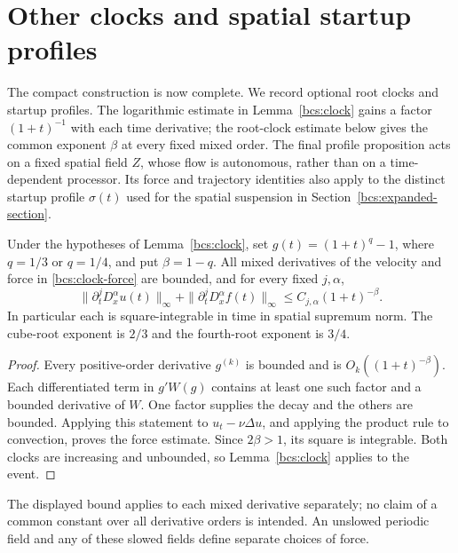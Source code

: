 \section{Other clocks and spatial startup profiles}\label{bcs:clock-options}
The compact construction is now complete. We record optional root clocks and startup profiles. The logarithmic estimate in Lemma~\ref{bcs:clock} gains a factor $(1+t)^{-1}$ with each time derivative; the root-clock estimate below gives the common exponent $\beta$ at every fixed mixed order. The final profile proposition acts on a fixed spatial field $Z$, whose flow is autonomous, rather than on a time-dependent processor. Its force and trajectory identities also apply to the distinct startup profile $\sigma(t)$ used for the spatial suspension in Section~\ref{bcs:expanded-section}.

\begin{proposition}\label{bcs:power-clock}
Under the hypotheses of Lemma~\ref{bcs:clock}, set $g(t)=(1+t)^q-1$, where $q=1/3$ or $q=1/4$, and put $\beta=1-q$. All mixed derivatives of the velocity and force in \eqref{bcs:clock-force} are bounded, and for every fixed $j,\alpha$,
\[
 \|\partial_t^jD_x^\alpha u(t)\|_\infty+
 \|\partial_t^jD_x^\alpha f(t)\|_\infty
 \le C_{j,\alpha}(1+t)^{-\beta}.
\]
In particular each is square-integrable in time in spatial supremum norm. The cube-root exponent is $2/3$ and the fourth-root exponent is $3/4$.
\end{proposition}
\begin{proof}
Every positive-order derivative $g^{(k)}$ is bounded and is $O_k((1+t)^{-\beta})$. Each differentiated term in $g'W(g)$ contains at least one such factor and a bounded derivative of $W$. One factor supplies the decay and the others are bounded. Applying this statement to $u_t-\nu\Delta u$, and applying the product rule to convection, proves the force estimate. Since $2\beta>1$, its square is integrable. Both clocks are increasing and unbounded, so Lemma~\ref{bcs:clock} applies to the event.
\end{proof}

The displayed bound applies to each mixed derivative separately; no claim of a common constant over all derivative orders is intended. An unslowed periodic field and any of these slowed fields define separate choices of force.


